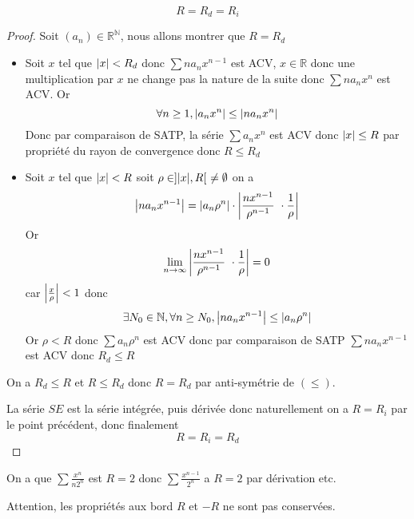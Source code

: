 \documentclass[11pt,colorlinks]{book}
\theoremstyle{mytheoremstyle}
\theoremstyle{mytheoremstyle}
\theoremstyle{mytheoremstyle}
\theoremstyle{mytheoremstyle}
\theoremstyle{mytheoremstyle}
\theoremstyle{mytheoremstyle}
\theoremstyle{mytheoremstyle}
\theoremstyle{mytheoremstyle}
\theoremstyle{myproblemstyle}
\def\mbb#1{\mathbb{#1}}
\def\bN{\mbb{N}}
\def\bR{\mbb{R}}
\def\ln{\lim_{n \to \infty}}
\def\rN{\bR^{\bN}}
\begin{document}
\begin{theorem}
  \begin{equation*}
    R = R_d = R_i
  \end{equation*}


  \begin{proof}
    Soit $(a_n) \in \rN$, nous allons montrer que $R = R_d$
    \begin{itemize}
      \item Soit $x$ tel que $\abs{x} < R_d$ donc $\sum n a_n x^{n-1}$ est ACV, $x \in \bR$ donc une multiplication par $x$ ne change pas 
      la nature de la suite donc $\sum n a_n x^n$ est ACV. Or
      \begin{equation*}
        \forall n \geq 1, \abs{a_n x^n} \leq \abs{n a_n x^n}
      \end{equation*}
      Donc par comparaison de SATP, la série $\sum a_n x^n$ est ACV donc $\abs{x} \leq R$ par propriété du rayon de convergence donc $R \leq R_d$
      \item Soit $x$ tel que $\abs{x} < R$ soit $\rho \in ]\abs{x},R[ \not= \emptyset$ on a 
      \begin{equation*}
        \abs{n a_n x^{n-1}} = \abs{a_n \rho^n} \cdot \abs{\frac{nx^{n-1}}{\rho^{n-1}} \cdot \frac{1}{\rho}}
      \end{equation*}
      Or 
      \begin{equation*}
        \ln \abs{\frac{nx^{n-1}}{\rho^{n-1}} \cdot \frac{1}{\rho}} = 0
      \end{equation*}
      car $\abs{\frac{x}{\rho}} < 1$
      donc
      \begin{equation*}
        \exists N_0 \in \bN, \forall n \geq N_0, \abs{n a_n x^{n-1}} \leq \abs{a_n \rho^n}
      \end{equation*}
      Or $\rho < R$ donc $\sum a_n \rho^n$ est ACV donc par comparaison de SATP $\sum n a_n x^{n-1}$ est ACV donc $R_d \leq R$
    \end{itemize}
    On a $R_d \leq R$ et $R \leq R_d$ donc $R = R_d$ par anti-symétrie de $(\leq)$.\newline 

    La série $SE$ est la série intégrée, puis dérivée donc naturellement on a $R = R_i$ par le point précédent, donc finalement
    \begin{equation*}
      R = R_i = R_d
    \end{equation*}
  \end{proof}
\end{theorem}
\begin{ex}
  On a que $\sum \frac{x^n}{n2^n}$ est $R=2$ donc $\sum \frac{x^{n-1}}{2^n}$ a $R=2$ par dérivation etc.
\end{ex}
\begin{rmq}
  Attention, les propriétés aux bord $R$ et $-R$ ne sont pas conservées.
\end{rmq}
\end{document}
